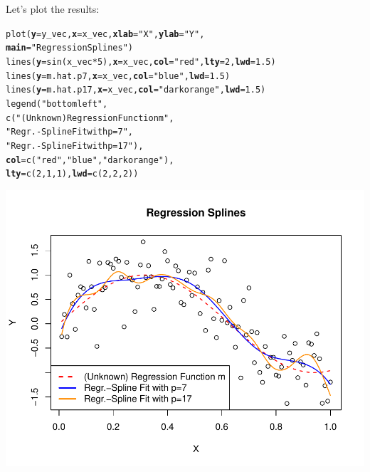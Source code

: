 \documentclass[14pt]{extreport}\usepackage[]{graphicx}\usepackage[]{xcolor}
\makeatletter
\def\maxwidth{ %
  \ifdim\Gin@nat@width>\linewidth
    \linewidth
  \else
    \Gin@nat@width
  \fi
}
\newcommand{\hlnum}[1]{\textcolor[rgb]{0.69,0.494,0}{#1}}%
\newcommand{\hlstr}[1]{\textcolor[rgb]{0.749,0.012,0.012}{#1}}%
\newcommand{\hlopt}[1]{\textcolor[rgb]{0,0,0}{#1}}%
\newcommand{\hlstd}[1]{\textcolor[rgb]{0,0,0}{#1}}%
\newcommand{\hlkwc}[1]{\textcolor[rgb]{0,0,0}{\textbf{#1}}}%
\newcommand{\hlkwd}[1]{\textcolor[rgb]{0.004,0.004,0.506}{#1}}%
\newenvironment{kframe}{%
 \def\at@end@of@kframe{}%
 \ifinner\ifhmode%
  \def\at@end@of@kframe{\end{minipage}}%
  \begin{minipage}{\columnwidth}%
 \fi\fi%
 \def\FrameCommand##1{\hskip\@totalleftmargin \hskip-\fboxsep
 \colorbox{shadecolor}{##1}\hskip-\fboxsep
     \hskip-\linewidth \hskip-\@totalleftmargin \hskip\columnwidth}%
 \MakeFramed {\advance\hsize-\width
   \@totalleftmargin\z@ \linewidth\hsize
   \@setminipage}}%
 {\par\unskip\endMakeFramed%
 \at@end@of@kframe}
\newenvironment{knitrout}{}{} %
\makeatother
\begin{document}
Let's plot the results:
\begin{knitrout}
\color{fgcolor}\begin{kframe}
\begin{alltt}
\hlkwd{plot}\hlstd{(}\hlkwc{y}\hlstd{=y_vec,} \hlkwc{x}\hlstd{=x_vec,} \hlkwc{xlab}\hlstd{=}\hlstr{"X"}\hlstd{,} \hlkwc{ylab}\hlstd{=}\hlstr{"Y"}\hlstd{,}
     \hlkwc{main}\hlstd{=}\hlstr{"Regression Splines"}\hlstd{)}
\hlkwd{lines}\hlstd{(}\hlkwc{y}\hlstd{=}\hlkwd{sin}\hlstd{(x_vec} \hlopt{*} \hlnum{5}\hlstd{),} \hlkwc{x}\hlstd{=x_vec,} \hlkwc{col}\hlstd{=}\hlstr{"red"}\hlstd{,} \hlkwc{lty}\hlstd{=}\hlnum{2}\hlstd{,} \hlkwc{lwd}\hlstd{=}\hlnum{1.5}\hlstd{)}
\hlkwd{lines}\hlstd{(}\hlkwc{y}\hlstd{=m.hat.p7,} \hlkwc{x}\hlstd{=x_vec,} \hlkwc{col}\hlstd{=}\hlstr{"blue"}\hlstd{,} \hlkwc{lwd}\hlstd{=}\hlnum{1.5}\hlstd{)}
\hlkwd{lines}\hlstd{(}\hlkwc{y}\hlstd{=m.hat.p17,} \hlkwc{x}\hlstd{=x_vec,} \hlkwc{col}\hlstd{=}\hlstr{"darkorange"}\hlstd{,} \hlkwc{lwd}\hlstd{=}\hlnum{1.5}\hlstd{)}
\hlkwd{legend}\hlstd{(}\hlstr{"bottomleft"}\hlstd{,}
       \hlkwd{c}\hlstd{(}\hlstr{"(Unknown) Regression Function m"}\hlstd{,}
         \hlstr{"Regr.-Spline Fit with p=7"}\hlstd{,}
         \hlstr{"Regr.-Spline Fit with p=17"}\hlstd{),}
       \hlkwc{col}\hlstd{=}\hlkwd{c}\hlstd{(}\hlstr{"red"}\hlstd{,}\hlstr{"blue"}\hlstd{,} \hlstr{"darkorange"}\hlstd{),}
       \hlkwc{lty}\hlstd{=}\hlkwd{c}\hlstd{(}\hlnum{2}\hlstd{,}\hlnum{1}\hlstd{,}\hlnum{1}\hlstd{),} \hlkwc{lwd}\hlstd{=}\hlkwd{c}\hlstd{(}\hlnum{2}\hlstd{,}\hlnum{2}\hlstd{,}\hlnum{2}\hlstd{))}
\end{alltt}
\end{kframe}

{\centering \includegraphics[width=\maxwidth]{figure/unnamed-chunk-11-1} 

}


\end{knitrout}
\end{document}

